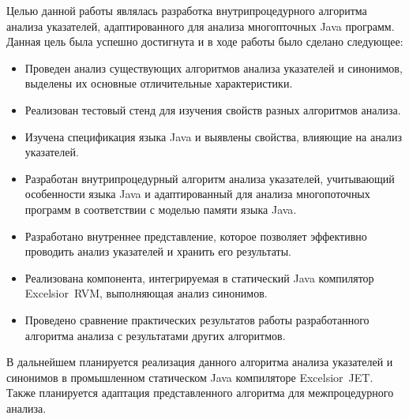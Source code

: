 \documentclass[14pt,titlepage]{extarticle}
\newcommand{\eng}[1]{{\English#1}}
\newcommand{\java}{\eng{Java}\xspace}
\begin{document}
    Целью данной работы являлась разработка внутрипроцедурного алгоритма
    анализа указателей, адаптированного для анализа многопточных \java программ.
    Данная цель была успешно достигнута и в ходе работы было сделано следующее:
    \begin{itemize}
      \item Проведен анализ существующих алгоритмов анализа указателей и
            синонимов, выделены их основные отличительные характеристики.
      \item Реализован тестовый стенд для изучения свойств разных алгоритмов
            анализа.
      \item Изучена спецификация языка \java и выявлены свойства, влияющие на
            анализ указателей.
      \item Разработан внутрипроцедурный алгоритм анализа указателей,
            учитывающий особенности языка \java и адаптированный для анализа
            многопоточных программ в соответствии с моделью памяти языка \java.
      \item Разработано внутреннее представление, которое позволяет эффективно
            проводить анализ указателей и хранить его результаты.
      \item Реализована компонента, интегрируемая в статический \java компилятор
            \eng{Excelsior~RVM}, выполняющая анализ синонимов.
      \item Проведено сравнение практических результатов работы разработанного
            алгоритма анализа с результатами других алгоритмов.
    \end{itemize}

    В дальнейшем планируется реализация данного алгоритма анализа указателей и
    синонимов в промышленном статическом \java компиляторе \eng{Excelsior~JET}.
    Также планируется адаптация представленного алгоритма для межпроцедурного
    анализа.

  \newpage
  
\end{document}
